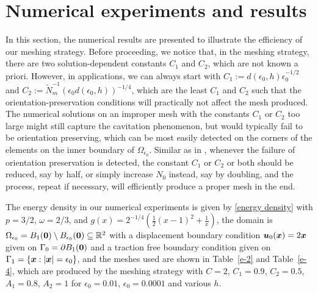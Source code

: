 \documentclass[12pt]{article}
\renewcommand{\vec}[1]{\mbox{\boldmath$#1$}}
\numberwithin{equation}{section}
\begin{document}
\section{Numerical experiments and results}

In this section, the numerical results are presented to illustrate the efficiency of our
meshing strategy. Before proceeding, we notice that, in the meshing strategy, there are
two solution-dependent constants $C_1$ and $C_2$, which are not known a priori. However,
in applications, we can always start with $C_1:= d(\epsilon_0,h)
\epsilon_0^{-1/2}$ and $C_2:=\tilde{N}_m^{-1} (\epsilon_0d(\epsilon_0,h))^{-1/4}$,
which are the least $C_1$ and $C_2$ such that the orientation-preservation conditions
will practically not affect the mesh produced. The numerical solutions on an improper
mesh with the constants $C_1$ or $C_2$ too large might still capture the cavitation
phenomenon, but would typically fail to be orientation preserving, which
can be most easily detected on the corners of the elements on the inner boundary of
$\Omega_{\epsilon_0}$. Similar as in \cite{SuLiRectan}, whenever the failure of
orientation preservation is detected, the constant $C_1$ or $C_2$ or both should be
reduced, say by half, or simply increase $N_0$ instead, say by doubling, and the
process, repeat if necessary, will efficiently produce a proper mesh in the end.

The energy density in our numerical experiments is given by
\eqref{energy density} with $p=3/2$, $\omega=2/3$, and
$g(x)=2^{-1/4}(\frac12(x-1)^2+\frac{1}{x})$, the domain is
$\Omega_{\epsilon_0} = B_1(\vec{0}) \setminus B_{\epsilon_0}(\vec{0}) \subseteq \mathbb{R}^2$
with a displacement boundary condition $\vec{u}_0(\vec{x})=2\vec{x}$ given on
$\Gamma_0=\partial B_1(\vec{0})$ and a traction free boundary condition given on
$\Gamma_1=\{\vec{x}: |\vec{x}|=\epsilon_0\}$,
and the meshes used are shown in Table~\ref{e-2} and Table~\ref{e-4}, which are produced by the
meshing strategy with $C=2$, $C_1=0.9$, $C_2=0.5$, $A_1=0.8$, $A_2=1$ for $\epsilon_0=0.01$,
$\epsilon_0=0.0001$ and various $h$.
\end{document}
